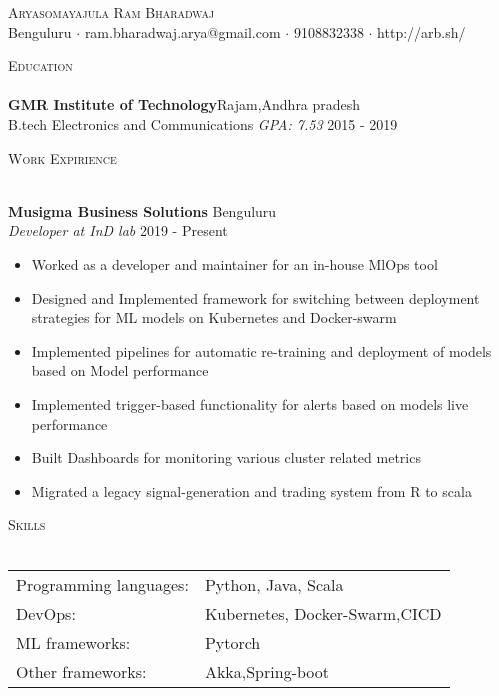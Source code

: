 \documentclass[a4paper]{article}
\newcommand{\lineunder} {
    \vspace*{-8pt} \\
    \hspace*{-18pt} \hrulefill \\
}
\newcommand{\header} [1] {
    {\hspace*{-18pt}\vspace*{6pt} \textsc{#1}}
    \vspace*{-6pt} \lineunder
}
\begin{document}
\vspace*{-40pt}

    

\vspace*{-10pt}
\begin{center}
	{\Huge \scshape {Aryasomayajula Ram Bharadwaj}}\\
	Benguluru $\cdot$ ram.bharadwaj.arya@gmail.com $\cdot$ 9108832338 $\cdot$ http://arb.sh/\\
\end{center}

\header{Education}
\textbf{GMR Institute of Technology}\hfill Rajam,Andhra pradesh\\
B.tech Electronics and Communications \textit{GPA: 7.53} \hfill 2015 - 2019\\
\vspace{2mm}

\header{Work Expirience}
\vspace{1mm}

\textbf{Musigma Business Solutions} \hfill Benguluru\\
\textit{Developer at InD lab} \hfill 2019 - Present\\
\vspace{-1mm}
\begin{itemize} \itemsep 1pt
	\item Worked as a developer and maintainer for an in-house MlOps tool
	\item Designed and Implemented framework for switching between deployment strategies for ML models on Kubernetes and Docker-swarm
	\item Implemented pipelines for automatic re-training and deployment of models based on Model performance
	\item Implemented trigger-based functionality for alerts based on model\textquotesingle{}s live performance
	\item Built Dashboards for monitoring various cluster related metrics
	\item Migrated a legacy signal-generation and trading system from R to scala
\end{itemize}

\header{Skills}
\begin{tabular}{ l l }
	Programming languages: & Python, Java, Scala           \\
	DevOps:                & Kubernetes, Docker-Swarm,CICD \\
	ML frameworks:         & Pytorch                       \\
	Other frameworks:      & Akka,Spring-boot              \\
\end{tabular}
\vspace{2mm}
\end{document}
